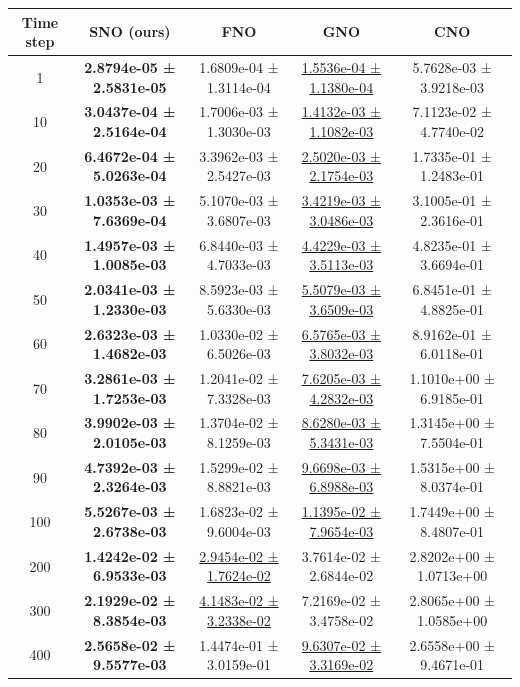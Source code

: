 \documentclass{article}
\theoremstyle{plain}
\theoremstyle{definition}
\theoremstyle{remark}
\begin{document}
\begin{table}[htbp]
\centering
\small
\setlength{\tabcolsep}{6pt}
\begin{tabular}{ccccc}
\hline
Time step & SNO (ours) & FNO & GNO & CNO \\
\hline
1   & \textbf{2.8794e-05 ± 2.5831e-05} & 1.6809e-04 ± 1.3114e-04 & \underline{1.5536e-04 ± 1.1380e-04} & 5.7628e-03 ± 3.9218e-03 \\
10  & \textbf{3.0437e-04 ± 2.5164e-04} & 1.7006e-03 ± 1.3030e-03 & \underline{1.4132e-03 ± 1.1082e-03} & 7.1123e-02 ± 4.7740e-02 \\
20  & \textbf{6.4672e-04 ± 5.0263e-04} & 3.3962e-03 ± 2.5427e-03 & \underline{2.5020e-03 ± 2.1754e-03} & 1.7335e-01 ± 1.2483e-01 \\
30  & \textbf{1.0353e-03 ± 7.6369e-04} & 5.1070e-03 ± 3.6807e-03 & \underline{3.4219e-03 ± 3.0486e-03} & 3.1005e-01 ± 2.3616e-01 \\
40  & \textbf{1.4957e-03 ± 1.0085e-03} & 6.8440e-03 ± 4.7033e-03 & \underline{4.4229e-03 ± 3.5113e-03} & 4.8235e-01 ± 3.6694e-01 \\
50  & \textbf{2.0341e-03 ± 1.2330e-03} & 8.5923e-03 ± 5.6330e-03 & \underline{5.5079e-03 ± 3.6509e-03} & 6.8451e-01 ± 4.8825e-01 \\
60  & \textbf{2.6323e-03 ± 1.4682e-03} & 1.0330e-02 ± 6.5026e-03 & \underline{6.5765e-03 ± 3.8032e-03} & 8.9162e-01 ± 6.0118e-01 \\
70  & \textbf{3.2861e-03 ± 1.7253e-03} & 1.2041e-02 ± 7.3328e-03 & \underline{7.6205e-03 ± 4.2832e-03} & 1.1010e+00 ± 6.9185e-01 \\
80  & \textbf{3.9902e-03 ± 2.0105e-03} & 1.3704e-02 ± 8.1259e-03 & \underline{8.6280e-03 ± 5.3431e-03} & 1.3145e+00 ± 7.5504e-01 \\
90  & \textbf{4.7392e-03 ± 2.3264e-03} & 1.5299e-02 ± 8.8821e-03 & \underline{9.6698e-03 ± 6.8988e-03} & 1.5315e+00 ± 8.0374e-01 \\
100 & \textbf{5.5267e-03 ± 2.6738e-03} & 1.6823e-02 ± 9.6004e-03 & \underline{1.1395e-02 ± 7.9654e-03} & 1.7449e+00 ± 8.4807e-01 \\
200 & \textbf{1.4242e-02 ± 6.9533e-03} & \underline{2.9454e-02 ± 1.7624e-02} & 3.7614e-02 ± 2.6844e-02 & 2.8202e+00 ± 1.0713e+00 \\
300 & \textbf{2.1929e-02 ± 8.3854e-03} & \underline{4.1483e-02 ± 3.2338e-02} & 7.2169e-02 ± 3.4758e-02 & 2.8065e+00 ± 1.0585e+00 \\
400 & \textbf{2.5658e-02 ± 9.5577e-03} & 1.4474e-01 ± 3.0159e-01 & \underline{9.6307e-02 ± 3.3169e-02} & 2.6558e+00 ± 9.4671e-01 \\

\end{tabular}
\end{table}
\end{document}
